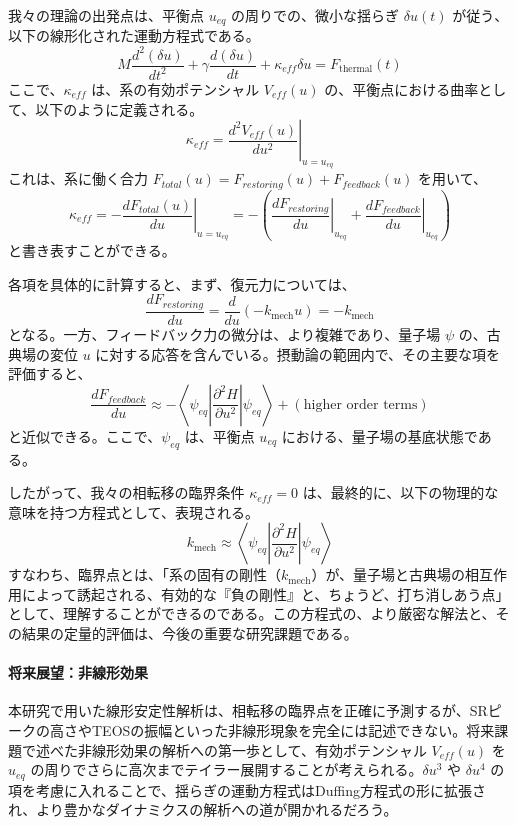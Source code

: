\documentclass[a4paper,11pt,ja=standard,lualatex]{bxjsarticle}
\begin{document}
我々の理論の出発点は、平衡点 $u_{eq}$ の周りでの、微小な揺らぎ $\delta u(t)$ が従う、以下の線形化された運動方程式である。
\begin{equation}
    M \frac{d^2(\delta u)}{dt^2} + \gamma \frac{d(\delta u)}{dt} + \kappa_{eff} \delta u = F_{\text{thermal}}(t)
\end{equation}
ここで、$\kappa_{eff}$ は、系の有効ポテンシャル $V_{eff}(u)$ の、平衡点における曲率として、以下のように定義される。
\begin{equation}
    \kappa_{eff} = \left. \frac{d^2 V_{eff}(u)}{du^2} \right|_{u=u_{eq}}
\end{equation}
これは、系に働く合力 $F_{total}(u) = F_{restoring}(u) + F_{feedback}(u)$ を用いて、
\begin{equation}
    \kappa_{eff} = \left. - \frac{d F_{total}(u)}{du} \right|_{u=u_{eq}} = - \left( \left. \frac{d F_{restoring}}{du} \right|_{u_{eq}} + \left. \frac{d F_{feedback}}{du} \right|_{u_{eq}} \right)
\end{equation}
と書き表すことができる。

各項を具体的に計算すると、まず、復元力については、
\begin{equation}
    \frac{d F_{restoring}}{du} = \frac{d}{du}(-k_{\text{mech}}u) = -k_{\text{mech}}
\end{equation}
となる。一方、フィードバック力の微分は、より複雑であり、量子場 $\psi$ の、古典場の変位 $u$ に対する応答を含んでいる。摂動論の範囲内で、その主要な項を評価すると、
\begin{equation}
    \frac{d F_{feedback}}{du} \approx -\left\langle \psi_{eq} \left| \frac{\partial^2 H}{\partial u^2} \right| \psi_{eq} \right\rangle + (\text{higher order terms})
\end{equation}
と近似できる。ここで、$\psi_{eq}$ は、平衡点 $u_{eq}$ における、量子場の基底状態である。

したがって、我々の相転移の臨界条件 $\kappa_{eff} = 0$ は、最終的に、以下の物理的な意味を持つ方程式として、表現される。
\begin{equation}
    k_{\text{mech}} \approx \left\langle \psi_{eq} \left| \frac{\partial^2 H}{\partial u^2} \right| \psi_{eq} \right\rangle
\end{equation}
すなわち、臨界点とは、「系の固有の剛性（$k_{\text{mech}}$）が、量子場と古典場の相互作用によって誘起される、有効的な『負の剛性』と、ちょうど、打ち消しあう点」として、理解することができるのである。この方程式の、より厳密な解法と、その結果の定量的評価は、今後の重要な研究課題である。

\paragraph{将来展望：非線形効果}
本研究で用いた線形安定性解析は、相転移の臨界点を正確に予測するが、SRピークの高さやTEOSの振幅といった非線形現象を完全には記述できない。将来課題で述べた非線形効果の解析への第一歩として、有効ポテンシャル $V_{eff}(u)$ を $u_{eq}$ の周りでさらに高次までテイラー展開することが考えられる。$\delta u^3$ や $\delta u^4$ の項を考慮に入れることで、揺らぎの運動方程式はDuffing方程式の形に拡張され、より豊かなダイナミクスの解析への道が開かれるだろう。
\end{document}
